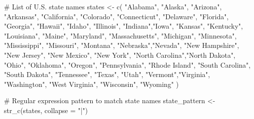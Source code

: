 \documentclass[
  12pt,
]{article}
\newenvironment{Shaded}{\begin{snugshade}}{\end{snugshade}}
\newcommand{\AttributeTok}[1]{\textcolor[rgb]{0.40,0.45,0.13}{#1}}
\newcommand{\CommentTok}[1]{\textcolor[rgb]{0.37,0.37,0.37}{#1}}
\newcommand{\FunctionTok}[1]{\textcolor[rgb]{0.28,0.35,0.67}{#1}}
\newcommand{\NormalTok}[1]{\textcolor[rgb]{0.00,0.23,0.31}{#1}}
\newcommand{\OtherTok}[1]{\textcolor[rgb]{0.00,0.23,0.31}{#1}}
\newcommand{\StringTok}[1]{\textcolor[rgb]{0.13,0.47,0.30}{#1}}
\begin{document}
\begin{Shaded}
\begin{Highlighting}[]
\CommentTok{\# List of U.S. state names}
\NormalTok{states }\OtherTok{\textless{}{-}} \FunctionTok{c}\NormalTok{(}
  \StringTok{"Alabama"}\NormalTok{, }\StringTok{"Alaska"}\NormalTok{, }\StringTok{"Arizona"}\NormalTok{, }\StringTok{"Arkansas"}\NormalTok{, }\StringTok{"California"}\NormalTok{, }\StringTok{"Colorado"}\NormalTok{, }
  \StringTok{"Connecticut"}\NormalTok{, }\StringTok{"Delaware"}\NormalTok{, }\StringTok{"Florida"}\NormalTok{, }\StringTok{"Georgia"}\NormalTok{, }\StringTok{"Hawaii"}\NormalTok{, }\StringTok{"Idaho"}\NormalTok{,}
  \StringTok{"Illinois"}\NormalTok{, }\StringTok{"Indiana"}\NormalTok{,}\StringTok{"Iowa"}\NormalTok{, }\StringTok{"Kansas"}\NormalTok{, }\StringTok{"Kentucky"}\NormalTok{, }\StringTok{"Louisiana"}\NormalTok{, }\StringTok{"Maine"}\NormalTok{,}
  \StringTok{"Maryland"}\NormalTok{, }\StringTok{"Massachusetts"}\NormalTok{, }\StringTok{"Michigan"}\NormalTok{, }\StringTok{"Minnesota"}\NormalTok{, }\StringTok{"Mississippi"}\NormalTok{,}
  \StringTok{"Missouri"}\NormalTok{, }\StringTok{"Montana"}\NormalTok{, }\StringTok{"Nebraska"}\NormalTok{,}\StringTok{"Nevada"}\NormalTok{, }\StringTok{"New Hampshire"}\NormalTok{, }\StringTok{"New Jersey"}\NormalTok{,}
  \StringTok{"New Mexico"}\NormalTok{, }\StringTok{"New York"}\NormalTok{, }\StringTok{"North Carolina"}\NormalTok{,}\StringTok{"North Dakota"}\NormalTok{, }\StringTok{"Ohio"}\NormalTok{,}
  \StringTok{"Oklahoma"}\NormalTok{, }\StringTok{"Oregon"}\NormalTok{, }\StringTok{"Pennsylvania"}\NormalTok{, }\StringTok{"Rhode Island"}\NormalTok{, }\StringTok{"South Carolina"}\NormalTok{,}
  \StringTok{"South Dakota"}\NormalTok{, }\StringTok{"Tennessee"}\NormalTok{, }\StringTok{"Texas"}\NormalTok{, }\StringTok{"Utah"}\NormalTok{, }\StringTok{"Vermont"}\NormalTok{,}\StringTok{"Virginia"}\NormalTok{,}
  \StringTok{"Washington"}\NormalTok{, }\StringTok{"West Virginia"}\NormalTok{, }\StringTok{"Wisconsin"}\NormalTok{, }\StringTok{"Wyoming"}
\NormalTok{)}

\CommentTok{\# Regular expression pattern to match state names}
\NormalTok{state\_pattern }\OtherTok{\textless{}{-}} \FunctionTok{str\_c}\NormalTok{(states, }\AttributeTok{collapse =} \StringTok{"|"}\NormalTok{)}



\end{Highlighting}
\end{Shaded}
\end{document}
